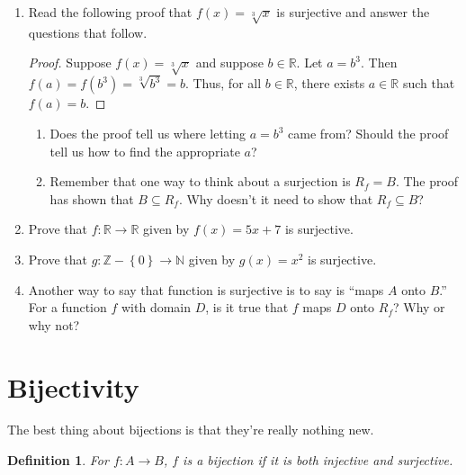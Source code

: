\documentclass[12 pt]{article}
\newcommand{\R}{\mathbb{R}}
\newcommand{\Z}{\mathbb{Z}}
\newcommand{\N}{\mathbb{N}}
\newcommand{\set}[1]{\left\{#1\right\}}
\newcommand{\esub}{\subseteq}
\theoremstyle{definition}
\theoremstyle{plain}
\theoremstyle{mytheorem}
\theoremstyle{myexample}
\theoremstyle{mydefinition}
\newtheorem*{definition*}{Definition}
\begin{document}
\begin{enumerate}
\item Read the following proof that $f(x)=\sqrt[3]{x}$ is surjective and answer the questions that follow.
	\begin{proof}
	Suppose $f(x) = \sqrt[3]{x}$ and suppose $b \in \R$.  Let $a=b^3$.  Then $f(a)=f(b^3)=\sqrt[3]{b^3}=b$.  Thus, for all $b \in \R$, there exists $a \in \R$ such that $f(a)=b$.
	\end{proof}
	\begin{enumerate}
	\item Does the proof tell us where letting $a=b^3$ came from?  Should the proof tell us how to find the appropriate $a$?
	
	\vspace{1.5in}
	
	\item Remember that one way to think about a surjection is $R_f=B$.  The proof has shown that $B \esub R_f$.  Why doesn't it need to show that $R_f \esub B$?
	
	\vspace{2in}
	\end{enumerate}

\item Prove that $f: \R \to \R$ given by $f(x) = 5x+7$ is surjective.

\vspace{2.5in}  

\item Prove that $g: \Z-\set{0} \to \N$ given by $g(x)=x^2$ is surjective.

\vspace{2.5in}

\item Another way to say that function is surjective is to say is ``maps $A$ onto $B$.''  For a function $f$ with domain $D$, is it true that $f$ maps $D$ onto $R_f$?  Why or why not?

\vspace{2in}
\end{enumerate}

\section{Bijectivity}

The best thing about bijections is that they're really nothing new.

\begin{definition*}  For $f: A \to B$, $f$ is a \textit{bijection} if it is both injective and surjective.
\end{definition*}
\end{document}
